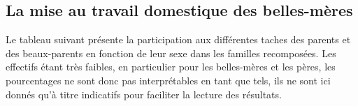 \documentclass[
  12pt,
]{book}
\begin{document}
\subsection{La mise au travail domestique des
belles-mères}\label{la-mise-au-travail-domestique-des-belles-muxe8res}

Le tableau suivant présente la participation aux différentes taches des
parents et des beaux-parents en fonction de leur sexe dans les familles
recomposées. Les effectifs étant très faibles, en particulier pour les
belles-mères et les pères, les pourcentages ne sont donc pas
interprétables en tant que tels, ils ne sont ici donnés qu'à titre
indicatifs pour faciliter la lecture des résultats.

\begingroup\fontsize{7}{9}\selectfont
\begingroup\fontsize{8}{10}\selectfont
\end{document}
